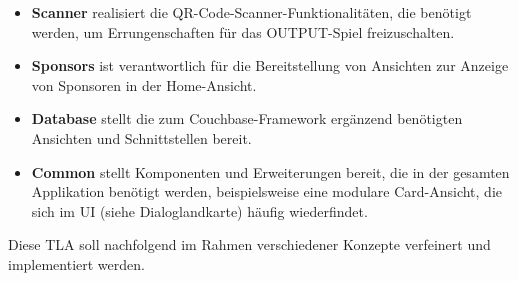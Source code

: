 \begin{itemize}
    \item \textbf{Scanner} realisiert die QR-Code-Scanner-Funktionalitäten, die benötigt werden, um Errungenschaften für das OUTPUT-Spiel freizuschalten.
    \item \textbf{Sponsors} ist verantwortlich für die Bereitstellung von Ansichten zur Anzeige von Sponsoren in der Home-Ansicht.
    \item \textbf{Database} stellt die zum Couchbase-Framework ergänzend benötigten Ansichten und Schnittstellen bereit.
    \item \textbf{Common} stellt Komponenten und Erweiterungen bereit, die in der gesamten Applikation benötigt werden, beispielsweise eine modulare Card-Ansicht, die sich im UI (siehe Dialoglandkarte) häufig wiederfindet.
\end{itemize}

Diese TLA soll nachfolgend im Rahmen verschiedener Konzepte verfeinert und implementiert werden.
